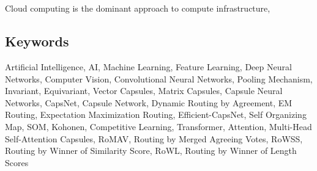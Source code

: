 \chapter*{}
\begin{otherlanguage}{english}
	

	Cloud computing is the dominant approach to compute infrastructure,

	\section*{Keywords}

	\noindent
Artificial Intelligence, AI, Machine Learning, Feature Learning, Deep Neural Networks, Computer Vision, Convolutional Neural Networks, Pooling Mechanism, Invariant, Equivariant, Vector Capsules, Matrix Capsules, Capsule Neural Networks, CapsNet, Capsule Network, Dynamic Routing by Agreement, EM Routing, Expectation Maximization Routing, Efficient-CapsNet, Self Organizing Map, SOM, Kohonen, Competitive Learning, Transformer, Attention, Multi-Head Self-Attention Capsules, RoMAV, Routing by Merged Agreeing Votes, RoWSS, Routing by Winner of Similarity Score, RoWL, Routing by Winner of Length Scores
\end{otherlanguage}
